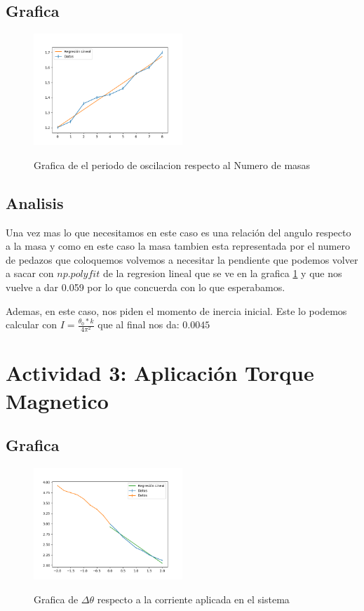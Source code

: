 \documentclass{report}
\begin{document}
\section{Grafica}
\begin{figure}[H]
	\caption{Grafica de el periodo de oscilacion respecto al Numero de masas}
	\centering
	\includegraphics[width=0.5\textwidth]{../Analisis/Graficas/actividad2.png}
	\label{graphics/actividad2}
\end{figure}

\section{Analisis}

Una vez mas lo que necesitamos en este caso es una relación del angulo respecto a la masa y como en este caso la masa tambien esta representada por el numero de pedazos que coloquemos volvemos a necesitar la pendiente que podemos volver a sacar con $np.polyfit$ de la regresion lineal que se ve en la grafica \ref{graphics/actividad2} y que nos vuelve a dar 0.059 por lo que concuerda con lo que esperabamos.

Ademas, en este caso, nos piden el momento de inercia inicial. Este lo podemos calcular con $I = \frac{\theta_0*k}{4\pi^2}$ que al final nos da: $0.0045$

\chapter{Actividad 3: Aplicación Torque Magnetico}

\section{Grafica}
\begin{figure}[H]
	\caption{Grafica de $\Delta \theta$ respecto a la corriente aplicada en el sistema}
	\centering
	\includegraphics[width=0.5\textwidth]{../Analisis/Graficas/actividad3.png}
	\label{graphics/actividad3}
\end{figure}
\end{document}
